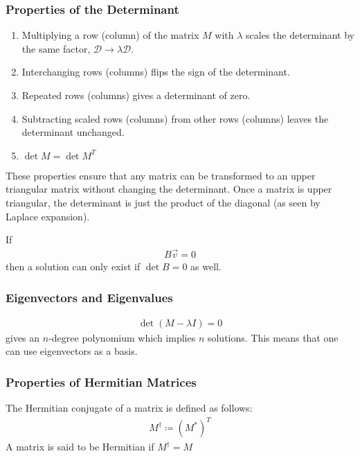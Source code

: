 \subsubsection{Properties of the Determinant}
\begin{enumerate}
    \item Multiplying a row (column) of the matrix \(M\) with \(\lambda\) scales the determinant by the same factor, \(\mathcal{D} \to \lambda \mathcal{D} \).
    \item Interchanging rows (columns) flips the sign of the determinant.
    \item Repeated rows (columns) gives a determinant of zero.
    \item Subtracting scaled rows (columns) from other rows (columns) leaves the determinant unchanged.
    \item \(\det M = \det M^T\) 
\end{enumerate}
These properties ensure that any matrix can be transformed to an upper triangular matrix without changing the determinant. Once a matrix is upper triangular, the determinant is just the product of the diagonal (as seen by Laplace expansion).

If \begin{align*}
    B \vec{v} = 0
\end{align*}
then a solution can only exist if \(\det B = 0\) as well.

\subsubsection{Eigenvectors and Eigenvalues}
\begin{align*}
    \det (M - \lambda I) = 0
\end{align*}
gives an \(n\)-degree polynomium which implies \(n\) solutions. This means that one can use eigenvectors as a basis. 

\subsubsection{Properties of Hermitian Matrices}
\begin{definition}
    The Hermitian conjugate of a matrix is defined as follows:
\begin{align*}
    M^{\dagger} \coloneqq \left( M^{\ast}  \right)^T
\end{align*}
A matrix is said to be Hermitian if \(M^{\dagger} = M\) 
\end{definition}

